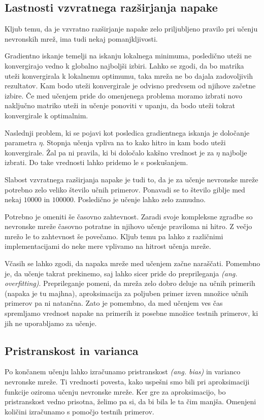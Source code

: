 \documentclass[mat1]{fmfdelo}
\begin{document}
\subsection{Lastnosti vzvratnega razširjanja napake}
Kljub temu, da je vzvratno razširjanje napake zelo priljubljeno pravilo pri učenju nevronskih mrež, ima tudi nekaj pomanjkljivosti. 

Gradientno iskanje temelji na iskanju lokalnega minimuma, posledično uteži ne konvergirajo vedno k globalno najboljši izbiri. Lahko se zgodi, da bo matrika uteži konvergirala k lokalnemu optimumu, taka mreža ne bo dajala zadovoljivih rezultatov. Kam bodo uteži konvergirale je odvisno predvsem od njihove začetne izbire. Če med učenjem pride do omenjenega problema moramo izbrati novo naključno matriko uteži in učenje ponoviti v upanju, da bodo uteži tokrat konvergirale k optimalnim.

Naslednji problem, ki se pojavi kot posledica gradientnega iskanja je določanje parametra $\eta$. Stopnja učenja vpliva na to kako hitro in kam bodo uteži konvergirale. Žal pa ni pravila, ki bi določalo kakšno vrednost je za $\eta$ najbolje izbrati. Do take vrednosti lahko pridemo le s poskušanjem.

Slabost vzvratnega razširjanja napake je tudi to, da je za učenje nevronske mreže potrebno zelo veliko število učnih primerov. Ponavadi se to število giblje med nekaj $10000$ in $100000$. Posledično je učenje lahko zelo zamudno.

Potrebno je omeniti še časovno zahtevnost. Zaradi svoje kompleksne zgradbe so nevronske mreže časovno potratne in njihovo učenje praviloma ni hitro. Z večjo mrežo le to zahtevnost še povečamo. Kljub temu pa lahko z različnimi implementacijami do neke mere vplivamo na hitrost učenja mreže.

Včasih se lahko zgodi, da napaka mreže med učenjem začne naraščati. Pomembno je, da učenje takrat prekinemo, saj lahko sicer pride do preprileganja \emph{(ang. overfitting)}. Preprileganje pomeni, da mreža zelo dobro deluje na učnih primerih (napaka je tu majhna), aproksimacija za poljuben primer izven množice učnih primerov pa ni natančna. Zato je pomembno, da med učenjem ves čas spremljamo vrednost napake na primerih iz posebne množice testnih primerov, ki jih ne uporabljamo za učenje.
%
\subsection{Pristranskost in varianca}
Po končanem učenju lahko izračunamo pristranskost \emph{(ang. bias)} in varianco nevronske mreže. Ti vrednosti povesta, kako uspešni smo bili pri aproksimaciji funkcije oziroma učenju nevronske mreže. Ker gre za aproksimacijo, bo pristranskost vedno prisotna, želimo pa si, da bi bila le ta čim manjša. Omenjeni količini izračunamo s pomočjo testnih primerov.
\end{document}
